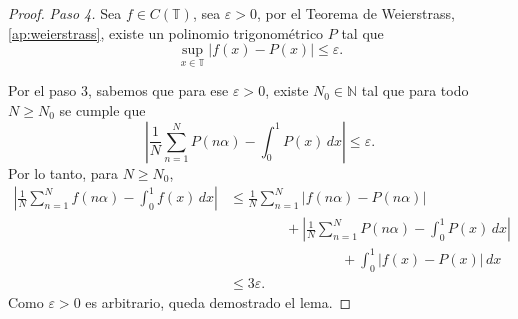 \begin{proof}
    \textit{Paso 4. } Sea $f\in C(\mathbb{T})$, sea $\varepsilon > 0$, por el Teorema 
    de Weierstrass, \ref{ap:weierstrass}, existe un polinomio trigonométrico 
    $P$ tal que 
    \[
        \sup_{x \in \mathbb{T}} |f(x)-P(x)| \leq \varepsilon.
    \]
    
    Por el paso 3, sabemos que para ese $\varepsilon > 0$, existe $N_0 \in \mathbb{N}$ tal que 
    para todo $N \geq N_0$ se cumple que 
    \[
        \left|\frac{1}{N} \sum_{n=1}^{N} P(n\alpha) - \int_0^1 P(x)\,dx\right| \leq \varepsilon.
    \]
    Por lo tanto, para $N \geq N_0$,
    \begin{align*}
        \left| \frac{1}{N} \sum_{n=1}^{N} f(n\alpha) - \int_0^1 f(x)\,dx \right|
        &\leq \frac{1}{N} \sum_{n=1}^{N} |f(n\alpha) - P(n\alpha)| \\  
        & \qquad\qquad +\left| \frac{1}{N} \sum_{n=1}^{N} P(n\alpha) - \int_0^1 P(x)\,dx \right| \\
        & \qquad\qquad\qquad\qquad +\int_0^1 |f(x) - P(x)|\,dx   \\
        &\leq 3\varepsilon.
    \end{align*}
    Como $\varepsilon > 0$ es arbitrario, queda demostrado el lema.     
\end{proof}